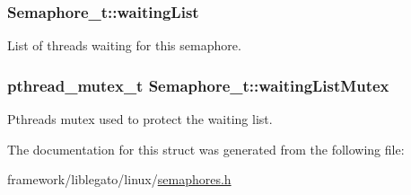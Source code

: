 \subsubsection[{\texorpdfstring{waiting\+List}{waitingList}}]{ Semaphore\+\_\+t\+::waiting\+List}\hypertarget{struct_semaphore__t_afddf45c7c1b831ceaea6dfcabe7da0ac}{}\label{struct_semaphore__t_afddf45c7c1b831ceaea6dfcabe7da0ac}


List of threads waiting for this semaphore. 

\subsubsection[{\texorpdfstring{waiting\+List\+Mutex}{waitingListMutex}}]{\setlength{\rightskip}{0pt plus 5cm}pthread\+\_\+mutex\+\_\+t Semaphore\+\_\+t\+::waiting\+List\+Mutex}\hypertarget{struct_semaphore__t_adb1a443e625146f5b426817db14af607}{}\label{struct_semaphore__t_adb1a443e625146f5b426817db14af607}


Pthreads mutex used to protect the waiting list. 



The documentation for this struct was generated from the following file\+:\begin{DoxyCompactItemize}
\item 
framework/liblegato/linux/\hyperlink{semaphores_8h}{semaphores.\+h}\end{DoxyCompactItemize}
